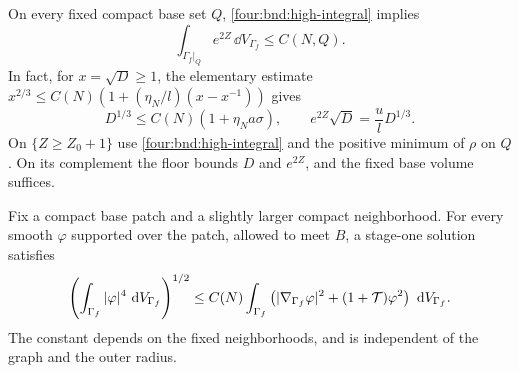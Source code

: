 On every fixed compact base set $Q$, \eqref{four:bnd:high-integral} implies
\begin{equation}\label{four:bnd:starting-L2}
 \int_{\Gamma_f\vert_Q}e^{2Z}\,\dd V_{\Gamma_f}\le C(N,Q).
\end{equation}
In fact, for $x=\sqrt D\ge1$, the elementary estimate
$x^{2/3}\le C(N)(1+(\eta_N/l)(x-x^{-1}))$ gives
\[
 D^{1/3}\le C(N)(1+\eta_Na\sigma),\qquad
 e^{2Z}\sqrt D=\frac{u}{l}D^{1/3}.
\]
On $\{Z\ge Z_0+1\}$ use \eqref{four:bnd:high-integral} and the
positive minimum of $\rho$ on $Q$.  On its complement the floor
bounds $D$ and $e^{2Z}$, and the fixed base volume suffices.

\begin{lemma}
\label{four:bnd:graph-sobolev}
Fix a compact base patch and a slightly larger compact neighborhood.
For every smooth $\varphi$ supported over the patch, allowed to meet
$B$, a stage-one solution satisfies
\begin{equation}\label{four:bnd:sobolev}
 \left(\int_{\Gamma_f}|\varphi|^4\,\,\mathrm d V_{\Gamma_f}\right)^{1/2}
 \le C(N)\int_{\Gamma_f}
 \left(|\nabla_{\Gamma_f}\varphi|^2+(1+\mathcal T)\varphi^2\right)
     \,\,\mathrm d V_{\Gamma_f}.
\end{equation}
The constant depends on the fixed neighborhoods, and is independent
of the graph and the outer radius.
\end{lemma}

